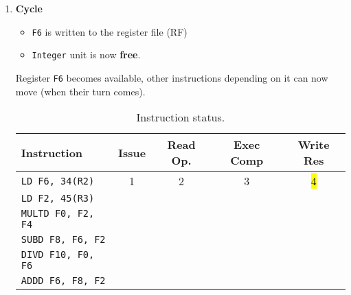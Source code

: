 \begin{enumerate}
    \newpage


    \item \textbf{Cycle \theenumi}
    \begin{itemize}
        \item \texttt{F6} is written to the register file (RF)
        \item \texttt{Integer} unit is now \textbf{free}.
    \end{itemize}
    Register \texttt{F6} becomes available, other instructions depending on it can now move (when their turn comes).

    \begin{table}[!htp]
        \centering
        \begin{tabular}{@{} l | c c c c @{}}
            \toprule
            Instruction                 & Issue & Read Op.  & Exec Comp & Write Res \\
            \midrule
            \texttt{LD    F6, 34(R2)}   & 1     & 2         & 3         & \hl{4}    \\ [.3em]
            \texttt{LD    F2, 45(R3)}   &       &           &           &           \\ [.3em]
            \texttt{MULTD F0, F2, F4}   &       &           &           &           \\ [.3em]
            \texttt{SUBD  F8, F6, F2}   &       &           &           &           \\ [.3em]
            \texttt{DIVD  F10, F0, F6}  &       &           &           &           \\ [.3em]
            \texttt{ADDD  F6, F8, F2}   &       &           &           &           \\
            \bottomrule
        \end{tabular}
        \caption*{Instruction status.}
    \end{table}


\end{enumerate}

